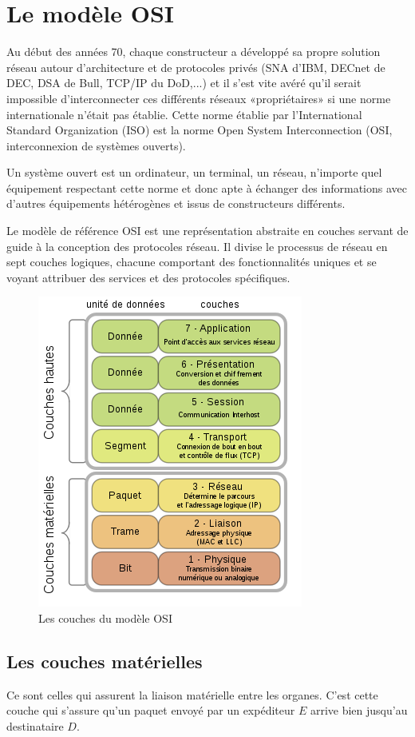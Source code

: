 \section{Le modèle OSI}
Au début des années 70, chaque constructeur a développé sa propre solution réseau autour d'architecture et de protocoles privés (SNA d'IBM, DECnet de DEC, DSA de Bull, TCP/IP du DoD,...) et il s'est vite avéré qu'il serait impossible d'interconnecter ces différents réseaux «propriétaires» si une norme internationale n'était pas établie. Cette norme établie par l'International Standard Organization (ISO) est la norme Open System Interconnection (OSI, interconnexion de systèmes ouverts).

Un système ouvert est un ordinateur, un terminal, un réseau, n'importe quel équipement respectant cette norme et donc apte à échanger des informations avec d'autres équipements hétérogènes et issus de constructeurs différents.

Le modèle de référence OSI est une représentation abstraite en couches servant de guide à la conception des protocoles réseau. Il divise le processus de réseau en sept couches logiques, chacune comportant des fonctionnalités uniques et se voyant attribuer des services et des protocoles spécifiques.

\begin{figure}[h!t]
  \centering
  \includegraphics[height=.3\textheight]{images/osi/reseau_OSI}
  \caption{Les couches du modèle OSI}
  \label{fig:res_osi}
\end{figure}

\subsection{Les couches matérielles}
\label{sec:couches}
Ce sont celles qui assurent la liaison matérielle entre les organes. C'est cette couche qui s'assure qu'un paquet envoyé par un expéditeur $E$ arrive bien jusqu'au destinataire $D$.

